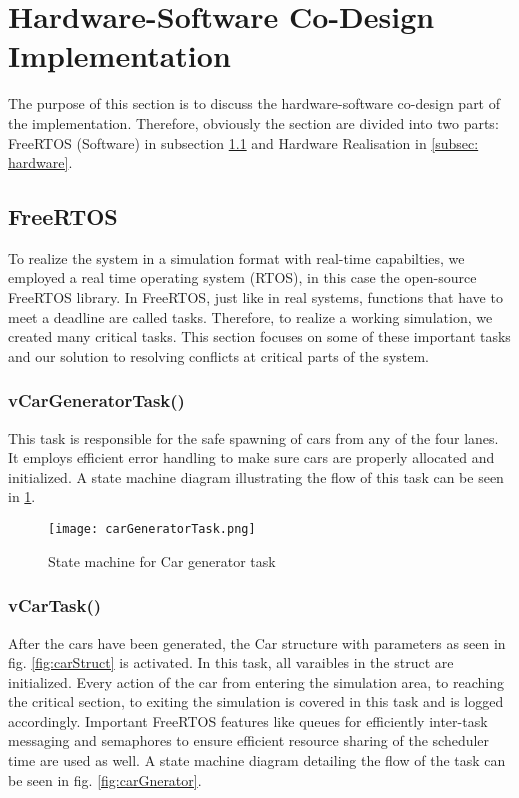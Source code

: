 \documentclass[conference]{IEEEtran}
\begin{document}
\section{Hardware-Software Co-Design Implementation}
The purpose of this section is to discuss the hardware-software co-design part of the implementation. Therefore, obviously the section are divided into two parts: FreeRTOS (Software) in subsection \ref{subsec: FreeRTOS} and Hardware Realisation in \ref{subsec: hardware}. 
\subsection{FreeRTOS}
\label{subsec: FreeRTOS}
To realize the system in a simulation format with real-time capabilties, we employed a real time operating system (RTOS), in this case the open-source FreeRTOS library. In FreeRTOS, just like in real systems, functions that have to meet a deadline are called tasks. Therefore, to realize a working simulation, we created many critical tasks. This section focuses on some of these important tasks and our solution to resolving conflicts at critical parts of the system. 

\subsubsection{vCarGeneratorTask()}
This task is responsible for the safe spawning of cars from any of the four lanes. It employs efficient error handling to make sure cars are properly allocated and initialized. A state machine diagram illustrating the flow of this task can be seen in \ref{fig:car-gen-sm}. 

\begin{figure}[h!]
  \centering
  \texttt{[image: carGeneratorTask.png]}
  \caption{State machine for Car generator task}
  \label{fig:car-gen-sm}
\end{figure}


\subsubsection{vCarTask()}
After the cars have been generated, the Car structure with parameters as seen in fig. \ref{fig:carStruct} is activated. In this task, all varaibles in the struct are initialized. Every action of the car from entering the simulation area, to reaching the critical section, to exiting the simulation is covered in this task and is logged accordingly. Important FreeRTOS features like queues for efficiently inter-task messaging and semaphores to ensure efficient resource sharing of the scheduler time are used as well. A state machine diagram detailing the flow of the task can be seen in fig. \ref{fig:carGnerator}.
\end{document}
